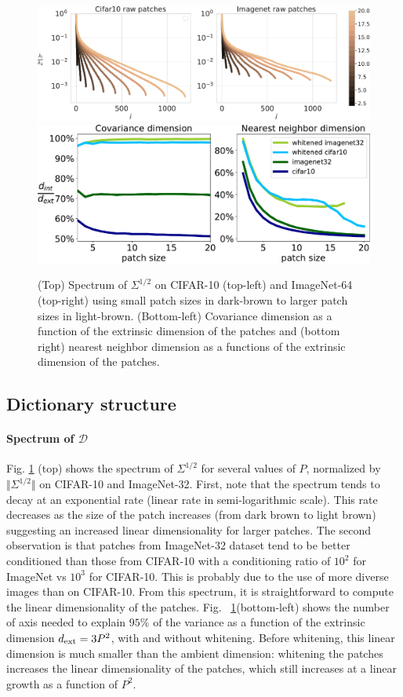\documentclass{article} %
\begin{document}
\begin{figure}[h]
    \centering
    	\caption{(Top) Spectrum  of $\Sigma^{1/2}$ on CIFAR-10 (top-left) and ImageNet-64 (top-right) using small patch sizes in dark-brown to larger patch sizes in light-brown.	(Bottom-left) Covariance dimension as a function of the extrinsic dimension of the patches and (bottom right) nearest neighbor dimension as a functions of the extrinsic dimension of the patches.}
	\label{fig:spec_intrinsic_dim}
    \includegraphics[width=.9\linewidth]{figures/spectrum_patches}
	\includegraphics[width=.85\linewidth]{figures/intrinsic_dims}
\vspace{-15pt}
\end{figure}


\subsection{Dictionary structure}
\label{structure}

\paragraph{Spectrum of $\mathcal{D}$}
Fig. \ref{fig:spec_intrinsic_dim} (top) shows the spectrum of $\Sigma^{1/2}$ for  several values of $P$, normalized by $\Vert \Sigma^{1/2}\Vert$ on CIFAR-10 and ImageNet-32.  First, note that the spectrum tends to decay at an exponential rate (linear rate in semi-logarithmic scale). This rate decreases as the size of the patch increases (from dark brown to light brown) suggesting an increased linear dimensionality for larger patches. The second observation is that patches from ImageNet-32 dataset tend to be better conditioned than those from CIFAR-10 with a conditioning ratio of $10^2$ for ImageNet vs $10^3$ for CIFAR-10. This is probably due to the use of more diverse images than on CIFAR-10. From this spectrum, it is straightforward to compute the linear dimensionality of the patches. Fig.
~\ref{fig:spec_intrinsic_dim}(bottom-left) shows the number of axis needed to explain $95\%$ of the variance as a function of the extrinsic dimension $d_{\rm ext} = 3P^2$, with and without whitening. Before whitening, this linear dimension is much smaller than the ambient dimension: whitening the patches increases the linear dimensionality of the patches, which still increases at a linear growth as a function of $P^2$.
\end{document}
